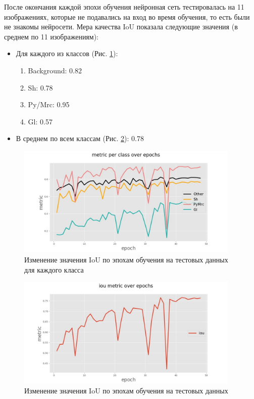 После окончания каждой эпохи обучения нейронная сеть тестировалась на 11 изображениях, которые не подавались на вход во время обучения, то есть были не знакомы нейросети. Мера качества IoU показала следующие значения (в среднем по 11 изображениям):
\begin{itemize}
    \item Для каждого из классов (Рис. \ref{fig:test_iou}):
    \begin{enumerate}[nosep]
        \item Background: 0.82
        \item Sh: 0.78
        \item Py/Mrc: 0.95
        \item Gl: 0.57
    \end{enumerate}
    \item В среднем по всем классам (Рис. \ref{fig:test_iou_average}): 0.78
\end{itemize}
\begin{figure}[H]
    \centering
    \includegraphics[width=0.95\textwidth]{pics/per_class_metric.jpg}
    \caption{Изменение значения IoU по эпохам обучения на тестовых данных для каждого класса}
    \label{fig:test_iou}
\end{figure}
\begin{figure}[H]
    \centering
    \includegraphics[width=0.95\textwidth]{pics/iou.jpg}
    \caption{Изменение значения IoU по эпохам обучения на тестовых данных}
    \label{fig:test_iou_average}
\end{figure}
